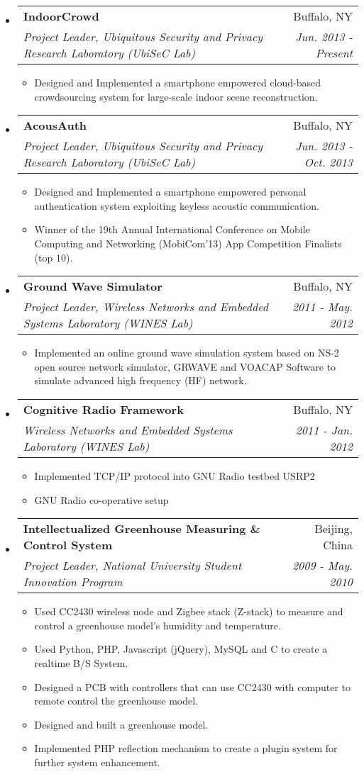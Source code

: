 \documentclass[a4paper, 11pt]{article}
\makeatletter
\newcommand{\resitem}[1]{\item #1 \vspace{-2pt}}
\newcommand{\ressubheading}[4]{
\begin{tabular*}{6.5in}{l@{\extracolsep{\fill}}r}
		\textbf{#1} & #2 \\
		\textit{#3} & \textit{#4} \\
\end{tabular*}\vspace{-6pt}}
\makeatother
\begin{document}
\begin{itemize}
\item
	\ressubheading{IndoorCrowd}{Buffalo, NY}{Project Leader, Ubiquitous Security and Privacy Research Laboratory
(UbiSeC Lab)}{Jun. 2013 - Present}
	\begin{itemize}
		\resitem{Designed and Implemented a smartphone empowered cloud-based crowdsourcing system for large-scale indoor scene reconstruction. }
	\end{itemize}


\item
	\ressubheading{AcousAuth}{Buffalo, NY}{Project Leader, Ubiquitous Security and Privacy Research Laboratory
(UbiSeC Lab)}{Jun. 2013 - Oct. 2013}
	\begin{itemize}
		\resitem{Designed and Implemented a smartphone empowered personal authentication system exploiting keyless acoustic communication. }
                 \resitem{Winner of the 19th Annual International Conference on Mobile Computing and Networking (MobiCom'13) App Competition Finalists (top 10).}
	\end{itemize}


\item
	\ressubheading{Ground Wave Simulator}{Buffalo, NY}{Project Leader, Wireless Networks and Embedded Systems Laboratory (WINES Lab)}{2011 - May. 2012}
	\begin{itemize}
		\resitem{Implemented an online ground wave simulation system based on NS-2 open source network simulator, GRWAVE and VOACAP Software to simulate advanced high frequency (HF) network.}
	\end{itemize}
	
\item
	\ressubheading{Cognitive Radio Framework}{Buffalo, NY}{Wireless Networks and Embedded Systems Laboratory (WINES Lab)}{2011 - Jan. 2012}
	\begin{itemize}
		\resitem{Implemented TCP/IP protocol into GNU Radio testbed USRP2}
		\resitem{GNU Radio co-operative setup}
	\end{itemize}
	
\item
	\ressubheading{Intellectualized Greenhouse Measuring \& Control System}{Beijing, China}{Project Leader, National University Student Innovation Program}{2009 - May. 2010}
	\begin{itemize}
		\resitem{Used CC2430 wireless node and Zigbee stack (Z-stack) to measure and control a greenhouse model's humidity and temperature.}
		\resitem{Used Python, PHP, Javascript (jQuery), MySQL and C to create a realtime B/S System.}
		\resitem{Designed a PCB with controllers that can use CC2430 with computer to remote control the greenhouse model.}
		\resitem{Designed and built a greenhouse model.}
		\resitem{Implemented PHP reflection mechanism to create a plugin system for further system enhancement.}
	\end{itemize}




\end{itemize}
\end{document}
